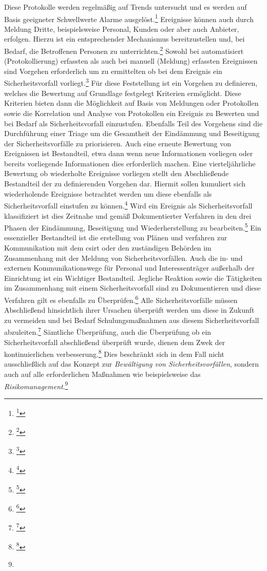 \documentclass[11pt,a4paper,hidelinks]{article}   %
\begin{document}
            Diese Protokolle werden regelmäßig auf Trends untersucht und es werden auf Basis geeigneter Schwellwerte Alarme ausgelöst.\footnote{\footcite[Vgl.][, Anhang, Nummer 3.2.4.]{EU2024-2690}} Ereignisse können auch durch Meldung Dritte, beispielsweise Personal, Kunden oder aber auch Anbieter, erfolgen. Hierzu ist ein entsprechender Mechanismus bereitzustellen und, bei Bedarf, die Betroffenen Personen zu unterrichten.\footnote{\footcite[Vgl.][, Anhang, Nummer 3.3.1.]{EU2024-2690}} Sowohl bei automatisiert (Protokollierung) erfassten als auch bei manuell (Meldung) erfassten Ereignissen sind Vorgehen erforderlich um zu ermittelten ob bei dem Ereignis ein Sicherheitsvorfall vorliegt.\footnote{\footcite[Vgl.][, Anhang, Nummer 3.4.1.]{EU2024-2690}} Für diese Feststellung ist ein Vorgehen zu definieren, welches die Bewertung auf Grundlage festgelegt Kriterien ermöglicht. Diese Kriterien bieten dann die Möglichkeit auf Basis von Meldungen oder Protokollen sowie die Korrelation und Analyse von Protokollen ein Ereignis zu Bewerten und bei Bedarf als Sicherheitsvorfall einzustufen. Ebenfalls Teil des Vorgehens sind die Durchführung einer Triage um die Gesamtheit der Eindämmung und Beseitigung der Sicherheitsvorfälle zu priorisieren. Auch eine erneute Bewertung von Ereignissen ist Bestandteil, etwa dann wenn neue Informationen vorliegen oder bereits vorliegende Informationen dies erforderlich machen. Eine vierteljährliche Bewertung ob wiederholte Ereignisse vorliegen stellt den Abschließende Bestandteil der zu definierenden Vorgehen dar. Hiermit sollen kumuliert sich wiederholende Ereignisse betrachtet werden um diese ebenfalls als Sicherheitsvorfall einstufen zu können.\footnote{\footcite[Vgl.][, Anhang, Nummer 3.4.2.]{EU2024-2690}} Wird ein Ereignis als Sicherheitsvorfall klassifiziert ist dies Zeitnahe und gemäß Dokumentierter Verfahren in den drei Phasen der Eindämmung, Beseitigung und Wiederherstellung zu bearbeiten.\footnote{\footcite[Vgl.][, Anhang, Nummer 3.5.1., 3.5.2. \& 3.5.4.]{EU2024-2690}} Ein essenzieller Bestandteil ist die erstellung von Plänen und verfahren zur Kommunikation mit dem \gls{csirt} oder den zuständigen Behörden im Zusammenhang mit der Meldung von Sicherheitsvorfällen. Auch die in- und externen Kommunikationswege für Personal und Interessenträger außerhalb der Einrichtung ist ein Wichtiger Bestandteil. Jegliche Reaktion sowie die Tätigkeiten im Zusammenhang mit einem Sicherheitsvorfall sind zu Dokumentieren und diese Verfahren gilt es ebenfalls zu Überprüfen.\footnote{\footcite[Vgl.][, Anhang, Nummer 3.5.3.]{EU2024-2690}} Alle Sicherheitsvorfälle müssen Abschließend hinsichtlich ihrer Ursachen überprüft werden um diese in Zukunft zu vermeiden und bei Bedarf Schulungsmaßnahmen aus diesem Sicherheitsvorfall abzuleiten.\footnote{\footcite[Vgl.][, Anhang, Nummer 3.6.1.]{EU2024-2690}} Sämtliche Überprüfung, auch die Überprüfung ob ein Sicherheitsvorfall abschließend überprüft wurde, dienen dem Zwek der kontinuierlichen verbesserung.\footnote{\footcite[Vgl.][, Anhang, Nummer 3.6.2.]{EU2024-2690}} Dies beschränkt sich in dem Fall nicht ausschließlich auf das Konzept zur \emph{Bewältigung von Sicherheitsvorfällen}, sondern auch auf alle erforderlichen Maßnahmen wie beispielsweise das \emph{Risikomanagement}.\footnote{
}
\end{document}
